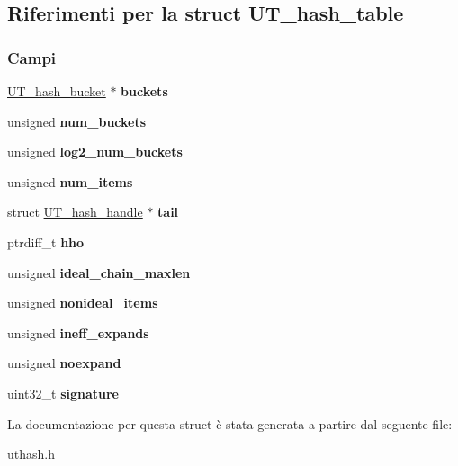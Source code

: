 \hypertarget{structUT__hash__table}{}\subsection{Riferimenti per la struct U\+T\+\_\+hash\+\_\+table}
\label{structUT__hash__table}
\subsubsection*{Campi}
\begin{DoxyCompactItemize}
\item 
\mbox{\label{structUT__hash__table_a04556bbef9c9a1c40b1bc0d17a2a6e0b}} 
\mbox{\hyperlink{structUT__hash__bucket}{U\+T\+\_\+hash\+\_\+bucket}} $\ast$ {\bfseries buckets}
\item 
\mbox{\label{structUT__hash__table_a3ed04b6233facaedf910672578d86339}} 
unsigned {\bfseries num\+\_\+buckets}
\item 
\mbox{\label{structUT__hash__table_ae376a7f3fac525f3a9d03b6beec8d12f}} 
unsigned {\bfseries log2\+\_\+num\+\_\+buckets}
\item 
\mbox{\label{structUT__hash__table_a74534cc14f080c96f94d8f5da83d9d76}} 
unsigned {\bfseries num\+\_\+items}
\item 
\mbox{\label{structUT__hash__table_a00a889a5e1ebaeec0a83ec2701df1992}} 
struct \mbox{\hyperlink{structUT__hash__handle}{U\+T\+\_\+hash\+\_\+handle}} $\ast$ {\bfseries tail}
\item 
\mbox{\label{structUT__hash__table_afd05f4d9e45354fb010367ae9e1bddb6}} 
ptrdiff\+\_\+t {\bfseries hho}
\item 
\mbox{\label{structUT__hash__table_a5f1cec93d5d753ba02097c797e4d67ad}} 
unsigned {\bfseries ideal\+\_\+chain\+\_\+maxlen}
\item 
\mbox{\label{structUT__hash__table_a8cb66cfb259a204cda59a815e4db664f}} 
unsigned {\bfseries nonideal\+\_\+items}
\item 
\mbox{\label{structUT__hash__table_a216c7d98cf40a0064bee94aa8a5bf1b7}} 
unsigned {\bfseries ineff\+\_\+expands}
\item 
\mbox{\label{structUT__hash__table_a635661789933752e7b83dac84430eae1}} 
unsigned {\bfseries noexpand}
\item 
\mbox{\label{structUT__hash__table_a87d1ab3f3ede1809c6a485972d20b25f}} 
uint32\+\_\+t {\bfseries signature}
\end{DoxyCompactItemize}


La documentazione per questa struct è stata generata a partire dal seguente file\+:\begin{DoxyCompactItemize}
\item 
uthash.\+h\end{DoxyCompactItemize}
